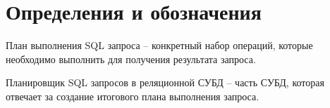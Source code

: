 \chapter*{Определения и обозначения}
План выполнения SQL запроса -- конкретный набор операций, которые необходимо выполнить для получения результата запроса.

Планировщик SQL запросов в реляционной СУБД -- часть СУБД, которая отвечает за создание итогового плана выполнения запроса.